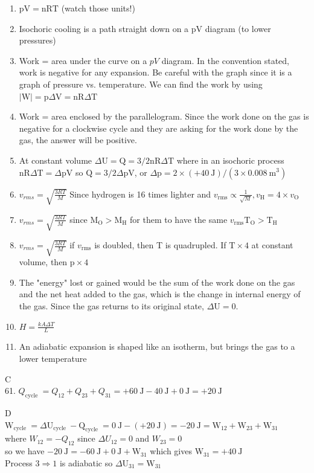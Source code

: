 \begin{enumerate}
\begin{enumerate}
  \item $\mathrm{pV}=\mathrm{nRT}$ (watch those units!)
  \item Isochoric cooling is a path straight down on a pV diagram (to lower pressures)
  \item Work = area under the curve on a $p V$ diagram. In the convention stated, work is negative for any expansion. Be careful with the graph since it is a graph of pressure vs. temperature. We can find the work by using $|\mathrm{W}|=\mathrm{p} \Delta \mathrm{V}=\mathrm{nR} \Delta \mathrm{T}$
  \item Work = area enclosed by the parallelogram. Since the work done on the gas is negative for a clockwise cycle and they are asking for the work done by the gas, the answer will be positive.
  \item At constant volume $\Delta \mathrm{U}=\mathrm{Q}=3 / 2 \mathrm{nR} \Delta \mathrm{T}$ where in an isochoric process $\mathrm{nR} \Delta \mathrm{T}=\Delta \mathrm{pV}$ so $\mathrm{Q}=3 / 2 \Delta \mathrm{pV}$, or $\Delta \mathrm{p}=2 \times(+40 \mathrm{~J}) /\left(3 \times 0.008 \mathrm{~m}^{3}\right)$
  \item $v_{r m s}=\sqrt{\frac{3 R T}{M}}$ Since hydrogen is 16 times lighter and $v_{\mathrm{rms}} \propto \frac{1}{\sqrt{M}}, v_{\mathrm{H}}=4 \times v_{\mathrm{O}}$
  \item $v_{r m s}=\sqrt{\frac{3 R T}{M}}$ since $\mathrm{M}_{\mathrm{O}}>\mathrm{M}_{\mathrm{H}}$ for them to have the same $v_{\mathrm{rms}} \mathrm{T}_{\mathrm{O}}>\mathrm{T}_{\mathrm{H}}$
  \item $v_{r m s}=\sqrt{\frac{3 R T}{M}}$ if $v_{\mathrm{rms}}$ is doubled, then T is quadrupled. If $\mathrm{T} \times 4$ at constant volume, then $\mathrm{p} \times 4$
  \item The "energy" lost or gained would be the sum of the work done on the gas and the net heat added to the gas, which is the change in internal energy of the gas. Since the gas returns to its original state, $\Delta \mathrm{U}=0$.
  \item $H=\frac{k A \Delta T}{L}$
  \item An adiabatic expansion is shaped like an isotherm, but brings the gas to a lower temperature
\end{enumerate}

C\\
61. $Q_{\text {cycle }}=Q_{12}+Q_{23}+Q_{31}=+60 \mathrm{~J}-40 \mathrm{~J}+0 \mathrm{~J}=+20 \mathrm{~J}$

D\\
$\mathrm{W}_{\text {cycle }}=\Delta \mathrm{U}_{\text {cycle }}-\mathrm{Q}_{\text {cycle }}=0 \mathrm{~J}-(+20 \mathrm{~J})=-20 \mathrm{~J}=\mathrm{W}_{12}+\mathrm{W}_{23}+\mathrm{W}_{31}$\\
where $W_{12}=-Q_{12}$ since $\Delta U_{12}=0$ and $W_{23}=0$\\
so we have $-20 \mathrm{~J}=-60 \mathrm{~J}+0 \mathrm{~J}+\mathrm{W}_{31}$ which gives $\mathrm{W}_{31}=+40 \mathrm{~J}$\\
Process $3 \Rightarrow 1$ is adiabatic so $\Delta \mathrm{U}_{31}=\mathrm{W}_{31}$


\end{enumerate}
